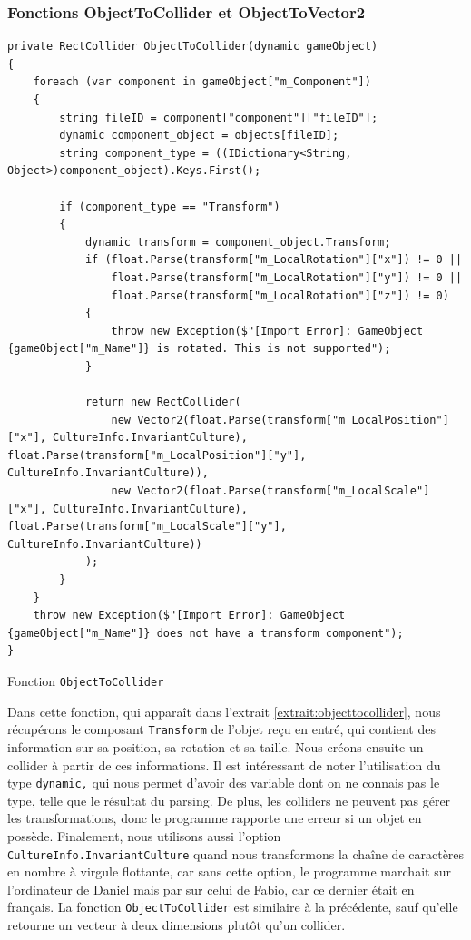 \documentclass[a4paper]{article}
\begin{document}
\subsubsection{Fonctions ObjectToCollider et ObjectToVector2}
\begin{listing}[!h]
\begin{verbatim}
private RectCollider ObjectToCollider(dynamic gameObject)
{
    foreach (var component in gameObject["m_Component"])
    {
        string fileID = component["component"]["fileID"];
        dynamic component_object = objects[fileID];
        string component_type = ((IDictionary<String, Object>)component_object).Keys.First();

        if (component_type == "Transform")
        {
            dynamic transform = component_object.Transform;
            if (float.Parse(transform["m_LocalRotation"]["x"]) != 0 ||
                float.Parse(transform["m_LocalRotation"]["y"]) != 0 ||
                float.Parse(transform["m_LocalRotation"]["z"]) != 0)
            {
                throw new Exception($"[Import Error]: GameObject {gameObject["m_Name"]} is rotated. This is not supported");
            }

            return new RectCollider(
                new Vector2(float.Parse(transform["m_LocalPosition"]["x"], CultureInfo.InvariantCulture), float.Parse(transform["m_LocalPosition"]["y"], CultureInfo.InvariantCulture)),
                new Vector2(float.Parse(transform["m_LocalScale"]["x"], CultureInfo.InvariantCulture), float.Parse(transform["m_LocalScale"]["y"], CultureInfo.InvariantCulture))
            );
        }
    }
    throw new Exception($"[Import Error]: GameObject {gameObject["m_Name"]} does not have a transform component");
}
\end{verbatim}
\caption{Fonction \texttt{ObjectToCollider}}
\label{extrait:objecttocollider}
\end{listing}
Dans cette fonction, qui apparaît dans l'extrait \ref{extrait:objecttocollider}, nous récupérons le composant \texttt{Transform} de l'objet reçu en entré, qui contient des information sur sa position, sa rotation et sa taille. Nous créons ensuite un collider à partir de ces informations. Il est intéressant de noter l'utilisation du type \texttt{dynamic,} qui nous permet d'avoir des variable dont on ne connais pas le type, telle que le résultat du parsing. De plus, les colliders ne peuvent pas gérer les transformations, donc le programme rapporte une erreur si un objet en possède. Finalement, nous utilisons aussi l'option \texttt{CultureInfo.InvariantCulture} quand nous transformons la chaîne de caractères en nombre à virgule flottante, car sans cette option, le programme marchait sur l'ordinateur de Daniel mais par sur celui de Fabio, car ce dernier était en français. La fonction \texttt{ObjectToCollider} est similaire à la précédente, sauf qu'elle retourne un vecteur à deux dimensions plutôt qu'un collider.
\end{document}
